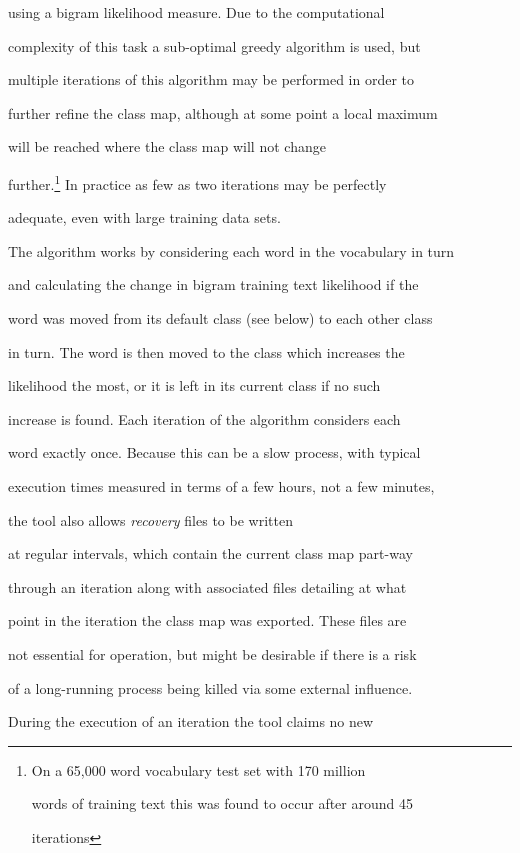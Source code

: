 using a bigram likelihood measure.  Due to the computational


complexity of this task a sub-optimal greedy algorithm is used, but


multiple iterations of this algorithm may be performed in order to


further refine the class map, although at some point a local maximum


will be reached where the class map will not change


further.\footnote{On a 65,000 word vocabulary test set with 170 million


words of training text this was found to occur after around 45


iterations}  In practice as few as two iterations may be perfectly


adequate, even with large training data sets.





The algorithm works by considering each word in the vocabulary in turn


and calculating the change in bigram training text likelihood if the


word was moved from its default class (see below) to each other class


in turn.  The word is then moved to the class which increases the


likelihood the most, or it is left in its current class if no such


increase is found.  Each iteration of the algorithm considers each


word exactly once.  Because this can be a slow process, with typical


execution times measured in terms of a few hours, not a few minutes,


the  tool also allows \textit{recovery} files to be written


at regular intervals, which contain the current class map part-way


through an iteration along with associated files detailing at what


point in the iteration the class map was exported.  These files are


not essential for operation, but might be desirable if there is a risk


of a long-running process being killed via some external influence.


During the execution of an iteration the tool claims no new


